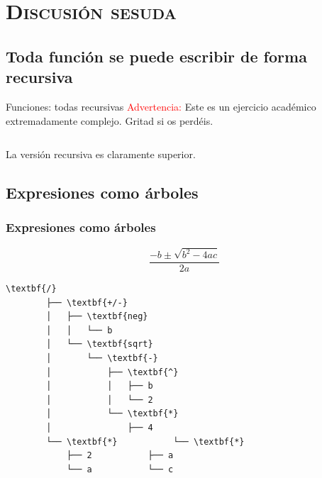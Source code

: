 \documentclass[xcolor=x11names,compress]{beamer}
\renewcommand{\(}{\begin{columns}}
\renewcommand{\)}{\end{columns}}
\newcommand{\<}[1]{\begin{column}{#1}}
\renewcommand{\>}{\end{column}}
\begin{document}

\section{\scshape Discusión sesuda}

\subsection{Toda función se puede escribir de forma recursiva}
\begin{frame}{Funciones: todas recursivas}
    \textcolor{red}{Advertencia:} Este es un ejercicio académico \pause extremadamente complejo\pause. Gritad si os perdéis. \pause
    \begin{columns}
        \begin{column}{.30\linewidth}
        \begin{block}
            \codeLengthIteration
        \end{block}
        \end{column}
        \begin{column}{.65\linewidth}
        \begin{block}
            \codeLengthRecursion
        \end{block}
        \end{column}
    \end{columns} \pause
    La versión recursiva es claramente superior.
\end{frame}


\subsection{Expresiones como árboles}
\begin{frame}[fragile]
    \frametitle{Expresiones como árboles}
    $$\frac{-b\pm\sqrt{b^2-4ac}}{2a}$$

\begin{Verbatim}[commandchars=\\\{\},codes={\catcode`$=3\catcode`_=8}]
        \textbf{/}
        ├── \textbf{+/-}
        │   ├── \textbf{neg}
        │   │   └── b
        │   └── \textbf{sqrt}
        │       └── \textbf{-}
        │           ├── \textbf{^}
        │           │   ├── b
        │           │   └── 2
        │           └── \textbf{*}
        │               ├── 4
        └── \textbf{*}           └── \textbf{*}
            ├── 2           ├── a
            └── a           └── c
\end{Verbatim}
\end{frame}
\end{document}
